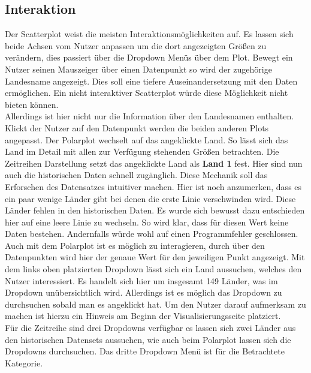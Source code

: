 \subsection{Interaktion}

Der Scatterplot weist die meisten Interaktionsmöglichkeiten auf. Es lassen sich beide Achsen vom Nutzer anpassen um die dort angezeigten Größen zu verändern, dies passiert über die Dropdown Menüs über dem Plot. Bewegt ein Nutzer seinen Mauszeiger über einen Datenpunkt so wird der zugehörige Landesname angezeigt. Dies soll eine tiefere Auseinandersetzung mit den Daten ermöglichen. Ein nicht interaktiver Scatterplot würde diese Möglichkeit nicht bieten können. \\

Allerdings ist hier nicht nur die Information über den Landesnamen enthalten. Klickt der Nutzer auf den Datenpunkt werden die beiden anderen Plots angepasst. Der Polarplot wechselt auf das angeklickte Land. So lässt sich das Land im Detail mit allen zur Verfügung stehenden Größen betrachten. Die Zeitreihen Darstellung setzt das angeklickte Land als \textbf{Land 1} fest. Hier sind nun auch die historischen Daten schnell zugänglich. Diese Mechanik soll das Erforschen des Datensatzes intuitiver machen. Hier ist noch anzumerken, dass es ein paar wenige Länder gibt bei denen die erste Linie verschwinden wird. Diese Länder fehlen in den historischen Daten. Es wurde sich bewusst dazu entschieden hier auf eine leere Linie zu wechseln. So wird klar, dass für diesen Wert keine Daten bestehen. Andernfalls würde wohl auf einen Programmfehler geschlossen.\\

Auch mit dem Polarplot ist es möglich zu interagieren, durch  über den Datenpunkten wird hier der genaue Wert für den jeweiligen Punkt angezeigt. 
Mit dem links oben platzierten Dropdown lässt sich ein Land aussuchen, welches den Nutzer interessiert. Es handelt sich hier um insgesamt 149 Länder, was im Dropdown unübersichtlich wird. Allerdings ist es möglich das Dropdown zu durchsuchen sobald man es angeklickt hat. Um den Nutzer darauf aufmerksam zu machen ist hierzu ein Hinweis  am Beginn der Visualisierungsseite platziert. \\

Für die Zeitreihe sind drei Dropdowns verfügbar es lassen sich zwei Länder aus den historischen Datensets aussuchen, wie auch beim Polarplot lassen sich die Dropdowns durchsuchen. Das dritte Dropdown Menü ist für die Betrachtete Kategorie.